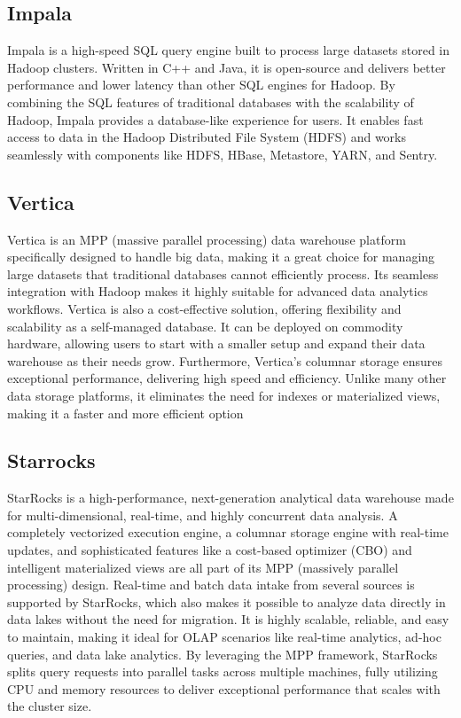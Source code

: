     \subsection{Impala}
    Impala is a high-speed SQL query engine built to process large datasets stored in Hadoop clusters. Written in C++ and Java, it is open-source and delivers better performance and lower latency than other SQL engines for Hadoop. By combining the SQL features of traditional databases with the scalability of Hadoop, Impala provides a database-like experience for users. It enables fast access to data in the Hadoop Distributed File System (HDFS) and works seamlessly with components like HDFS, HBase, Metastore, YARN, and Sentry.
    \cite{Tutorialspoint}
    \subsection{Vertica}
    Vertica is an MPP (massive parallel processing) data warehouse platform specifically designed to handle big data, making it a great choice for managing large datasets that traditional databases cannot efficiently process. Its seamless integration with Hadoop makes it highly suitable for advanced data analytics workflows. Vertica is also a cost-effective solution, offering flexibility and scalability as a self-managed database. It can be deployed on commodity hardware, allowing users to start with a smaller setup and expand their data warehouse as their needs grow. Furthermore, Vertica's columnar storage ensures exceptional performance, delivering high speed and efficiency. Unlike many other data storage platforms, it eliminates the need for indexes or materialized views, making it a faster and more efficient option
    \cite{Tobin}
    \subsection{Starrocks}
    StarRocks is a high-performance, next-generation analytical data warehouse made for multi-dimensional, real-time, and highly concurrent data analysis. A completely vectorized execution engine, a columnar storage engine with real-time updates, and sophisticated features like a cost-based optimizer (CBO) and intelligent materialized views are all part of its MPP (massively parallel processing) design. Real-time and batch data intake from several sources is supported by StarRocks, which also makes it possible to analyze data directly in data lakes without the need for migration.  It is highly scalable, reliable, and easy to maintain, making it ideal for OLAP scenarios like real-time analytics, ad-hoc queries, and data lake analytics. By leveraging the MPP framework, StarRocks splits query requests into parallel tasks across multiple machines, fully utilizing CPU and memory resources to deliver exceptional performance that scales with the cluster size.
    \cite{StarRocks}
